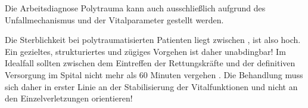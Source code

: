 Die Arbeitsdiagnose Polytrauma kann auch ausschließlich
aufgrund des Unfallmechanismus und der Vitalparameter
gestellt werden.


Die Sterblichkeit bei polytraumatisierten Patienten liegt
zwischen \PC*, ist also hoch. Ein gezieltes,
strukturiertes und zügiges Vorgehen ist daher unabdingbar!
Im Idealfall sollten zwischen dem Eintreffen der
Rettungskräfte und der definitiven Versorgung im Spital
nicht mehr als 60 Minuten vergehen \cite{BoehmerTaschRett6}.
Die Behandlung muss sich daher in erster Linie an der
Stabilisierung der Vitalfunktionen und nicht an den
Einzelverletzungen orientieren!




